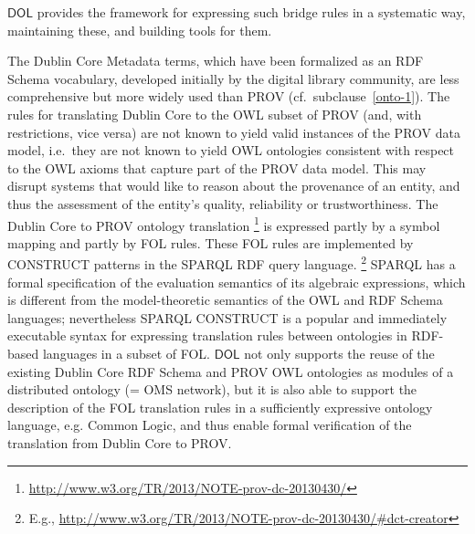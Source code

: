 \documentclass[10pt, a4paper]{isov2}
\newcommand*{\DOL}{\ensuremath{\mathsf{DOL}}\xspace}
\begin{document}
\DOL  provides the framework for expressing such bridge rules in a systematic way, maintaining these, and building tools for them. 


The Dublin Core Metadata terms, which have been formalized as an RDF Schema vocabulary, developed initially by the digital library community, are less 
comprehensive but more widely used than PROV (cf.\ subclause~\ref{onto-1}). The rules for translating Dublin Core to the OWL subset of PROV (and, with restrictions, 
vice versa) are not known to yield valid instances of the PROV data model, i.e.\ they are not known to yield OWL ontologies consistent with respect to the OWL axioms that 
capture part of the PROV data model. This may disrupt systems that would like to reason about the provenance of an entity, and thus the assessment of the 
entity's quality, reliability or trustworthiness.
The Dublin Core to PROV ontology translation%
\footnote{\url{http://www.w3.org/TR/2013/NOTE-prov-dc-20130430/}}
  is expressed partly by a symbol mapping and partly by FOL rules. These FOL rules are implemented by CONSTRUCT patterns in the SPARQL RDF query language.%
\footnote{E.g., \url{http://www.w3.org/TR/2013/NOTE-prov-dc-20130430/\#dct-creator}} 
SPARQL has a formal specification of the evaluation semantics of its algebraic expressions, which 
 is different from the model-theoretic semantics of the OWL and RDF Schema languages; nevertheless 
SPARQL CONSTRUCT is a popular and immediately executable syntax for expressing translation rules 
 between ontologies in RDF-based languages in a subset of FOL.
\DOL  not only supports the reuse of the existing Dublin Core RDF Schema and PROV OWL ontologies as 
 modules of a distributed ontology (= OMS network), but it is also able to support the description 
of the FOL translation rules in a sufficiently expressive ontology language, e.g. Common Logic, 
and thus enable formal verification of the translation from Dublin Core to PROV.


\end{document}
